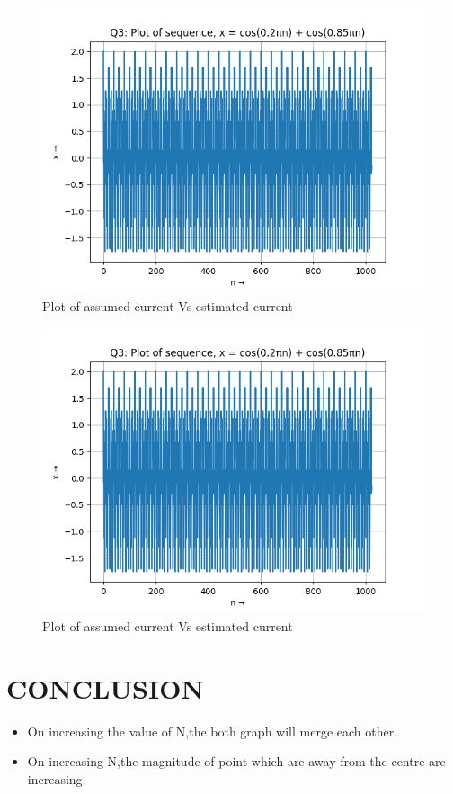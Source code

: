 \documentclass{article}
\begin{document}
\begin{figure}[h!]
\centering
\includegraphics[scale=0.5]{Figure_1.png}
\caption{Plot of assumed current Vs estimated current}
\label{fig:universe}
\end{figure}

\begin{figure}[h!]
\centering
\includegraphics[scale=0.5]{Figure_2.png}
\caption{Plot of assumed current Vs estimated current}
\label{fig:universe}
\end{figure}
\newpage
\section{CONCLUSION}
\begin{itemize}
    \item On increasing the value of N,the both graph will merge each other.
    \item  On increasing N,the magnitude of point which are away from the centre
are increasing.
\end{itemize}
 
\end{document}
